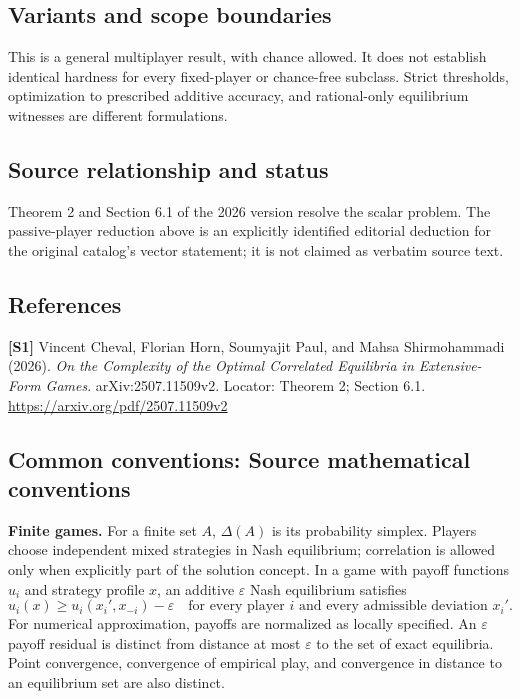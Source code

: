 \documentclass[11pt,a4paper]{article}
\begin{document}
\subsection*{Variants and scope boundaries}
This is a general multiplayer result, with chance allowed. It does not establish identical hardness for every fixed-player or chance-free subclass. Strict thresholds, optimization to prescribed additive accuracy, and rational-only equilibrium witnesses are different formulations.
\subsection*{Source relationship and status}
Theorem 2 and Section 6.1 of the 2026 version resolve the scalar problem. The passive-player reduction above is an explicitly identified editorial deduction for the original catalog's vector statement; it is not claimed as verbatim source text.
\subsection*{References}
\begingroup\footnotesize\raggedright
{\footnotesize\raggedright
\textbf{[S1]} Vincent Cheval, Florian Horn, Soumyajit Paul, and Mahsa Shirmohammadi (2026). \emph{On the Complexity of the Optimal Correlated Equilibria in Extensive-Form Games}. arXiv:2507.11509v2. Locator: Theorem 2; Section 6.1. \url{https://arxiv.org/pdf/2507.11509v2}\par}
\par\endgroup

\subsection*{Common conventions: Source mathematical conventions}

\textbf{Finite games.} For a finite set $A$, $\Delta(A)$ is its probability
simplex. Players choose independent mixed strategies in Nash equilibrium;
correlation is allowed only when explicitly part of the solution concept.
In a game with payoff functions $u_i$ and strategy profile $x$, an additive
$\varepsilon$ Nash equilibrium satisfies
\[
 u_i(x)\geq u_i(x_i',x_{-i})-\varepsilon
 \quad\text{for every player $i$ and every admissible deviation $x_i'$}.
\]
For numerical approximation, payoffs are normalized as locally specified.
An $\varepsilon$ payoff residual is distinct from distance at most
$\varepsilon$ to the set of exact equilibria. Point convergence, convergence
of empirical play, and convergence in distance to an equilibrium set are
also distinct.
\end{document}
